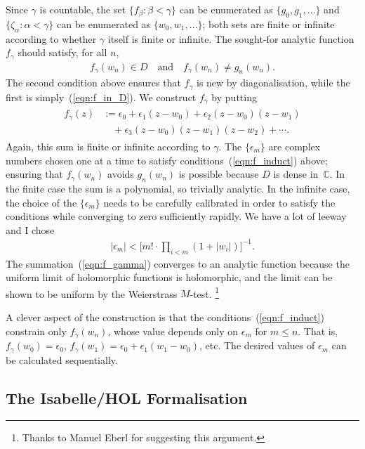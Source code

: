 \documentclass[runningheads]{llncs}
\begin{document}
Since $\gamma$ is countable, the set $\{f_\beta: \beta<\gamma\}$ can be enumerated as $\{g_0, g_1, \ldots\}$
and $\{\zeta_\alpha : \alpha < \gamma\}$ can be enumerated as $\{w_0, w_1, \ldots\}$;
both sets are finite or infinite according to whether $\gamma$ itself is finite or infinite.
The sought-for analytic function $f_\gamma$ should satisfy, for all $n$,
\begin{align}
	f_\gamma (w_n) \in D \quad\text{and}\quad f_\gamma (w_n) \not= g_n(w_n). \label{eqn:f_induct}
\end{align}
%
The second condition above ensures that $f_\gamma$ is new by diagonalisation, while the first is simply~(\ref{eqn:f_in_D}).
We construct $f_\gamma$ by putting
\begin{align}
\begin{split}
f_\gamma(z) & := \epsilon_0 + \epsilon_1 (z - w_0) + \epsilon_2 (z - w_0)(z - w_1)\\
	       & \quad + \epsilon_3 (z - w_0)(z - w_1)(z - w_2) + \cdots.	\label{eqn:f_gamma}
\end{split}
\end{align}
Again, this sum is finite or infinite according to $\gamma$. 
The $\{\epsilon_m\}$ are complex numbers chosen one at a time to satisfy conditions~(\ref{eqn:f_induct}) above; 
ensuring that $f_\gamma (w_n)$ avoids $g_n(w_n)$ is possible because $D$ is dense in~$\mathbb{C}$\@.
In the finite case the sum is a polynomial, so trivially analytic. 
In the infinite case, the choice of the $\{\epsilon_m\}$ needs to be carefully calibrated in order to satisfy the conditions while converging to zero sufficiently rapidly. 
We have a lot of leeway and I chose 
\begin{align}
|\epsilon_m| < \bigl[m! \cdot \prod_{i<m} (1 + |w_i|)\bigr]^{-1}.  \label{eqn:epsilon_bound}
\end{align}
The summation~(\ref{eqn:f_gamma}) converges to an analytic function because the uniform limit of holomorphic functions is holomorphic, and the limit can be shown to be uniform by the Weierstrass $M$-test.%
\footnote{Thanks to Manuel Eberl for suggesting this argument.}

A clever aspect of the construction is that the conditions~(\ref{eqn:f_induct}) constrain only $f_\gamma(w_n)$, 
whose value depends only on $\epsilon_m$ for $m\le n$. That is, $f_\gamma(w_0) = \epsilon_0$, $f_\gamma(w_1) = \epsilon_0 + \epsilon_1 (w_1 - w_0)$, etc.
The desired values of $\epsilon_m$ can be calculated sequentially.

\subsection{The Isabelle/HOL Formalisation}
\end{document}
